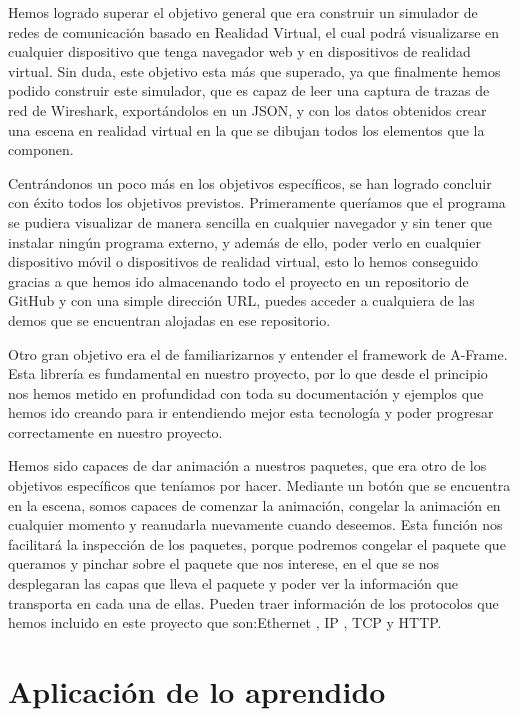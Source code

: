 \documentclass[a4paper, 12pt]{book}
\begin{document}
Hemos logrado superar el objetivo general que era construir un simulador de redes de comunicación basado
en Realidad Virtual, el cual podrá visualizarse en cualquier dispositivo que tenga navegador
web y en dispositivos de realidad virtual. Sin duda, este objetivo esta más que superado, ya que finalmente hemos podido construir este simulador, que es capaz de leer una captura de trazas de red de Wireshark, exportándolos en un JSON, y con los datos obtenidos crear una escena en realidad virtual en la que se dibujan todos los elementos que la componen.

Centrándonos un poco más en los objetivos específicos, se han logrado concluir con éxito todos los objetivos previstos. Primeramente queríamos que el programa se pudiera visualizar de manera sencilla en cualquier navegador y sin tener que instalar ningún programa externo, y además de ello, poder verlo en cualquier dispositivo móvil o dispositivos de realidad virtual, esto lo hemos conseguido gracias a que hemos ido almacenando todo el proyecto en un repositorio de GitHub y con una simple dirección URL, puedes acceder a cualquiera de las demos que se encuentran alojadas en ese repositorio.

Otro gran objetivo era el de familiarizarnos y entender el framework de A-Frame. Esta librería es fundamental en nuestro proyecto, por lo que desde el principio nos hemos metido en profundidad con toda su documentación y ejemplos que hemos ido creando para ir entendiendo mejor esta tecnología y poder progresar correctamente en nuestro proyecto.


Hemos sido capaces de dar animación a nuestros paquetes, que era otro de los objetivos específicos que teníamos por hacer. Mediante un botón que se encuentra en la escena, somos capaces de comenzar la animación, congelar la animación en cualquier momento y reanudarla nuevamente cuando deseemos.
Esta función nos facilitará la inspección de los paquetes, porque podremos congelar el paquete que queramos y pinchar sobre el paquete que nos interese, en el que se nos desplegaran las capas que lleva el paquete y poder ver la información que transporta en cada una de ellas. Pueden traer información de los protocolos que hemos incluido en este proyecto que son:Ethernet , IP , TCP y HTTP.


\section{Aplicación de lo aprendido}
\label{sec:aplicacion}
\end{document}
